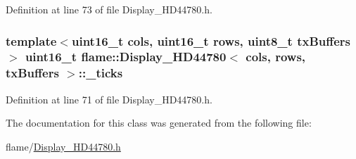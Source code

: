 Definition at line 73 of file Display\-\_\-\-H\-D44780.\-h.

\hypertarget{classflame_1_1_display___h_d44780_a58f971ca89d3a722304db94db25830b2}{
\subsubsection[{\-\_\-ticks}]{\setlength{\rightskip}{0pt plus 5cm}template$<$uint16\-\_\-t cols, uint16\-\_\-t rows, uint8\-\_\-t tx\-Buffers$>$ uint16\-\_\-t {\bf flame\-::\-Display\-\_\-\-H\-D44780}$<$ cols, rows, tx\-Buffers $>$\-::\-\_\-ticks\hspace{0.3cm}{\ttfamily [protected]}}}\label{classflame_1_1_display___h_d44780_a58f971ca89d3a722304db94db25830b2}


Definition at line 71 of file Display\-\_\-\-H\-D44780.\-h.



The documentation for this class was generated from the following file\-:\begin{DoxyCompactItemize}
\item 
flame/\hyperlink{_display___h_d44780_8h}{Display\-\_\-\-H\-D44780.\-h}\end{DoxyCompactItemize}
